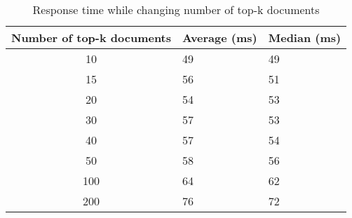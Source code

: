\begin{table}
    \centering
    \begin{tabular}{c|l|l}
     Number of top-k documents & Average (ms) & Median (ms) \\ \hline
    10                         & 49           & 49          \\ \hline
    15                         & 56           & 51          \\ \hline
    20                         & 54           & 53          \\ \hline
    30                         & 57           & 53          \\ \hline
    40                         & 57           & 54          \\ \hline
    50                         & 58           & 56          \\ \hline
    100                        & 64           & 62          \\ \hline
    200                        & 76           & 72          \\ \hline
    \end{tabular}
    \caption{Response time while changing number of top-k documents}
    \label{tbl:query-expansion-topk}
\end{table}
